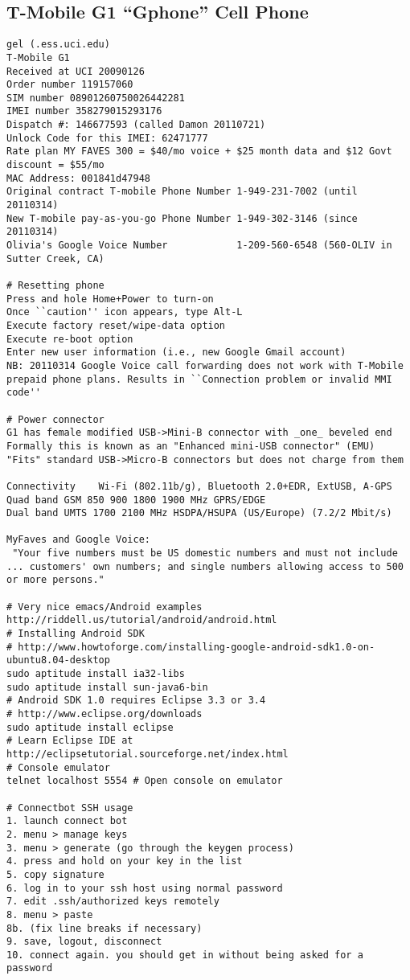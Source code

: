 \documentclass[12pt,twoside]{article}
\begin{document}
\subsection{T-Mobile G1 ``Gphone'' Cell Phone}\label{sxn:g1}
\begin{verbatim}
gel (.ess.uci.edu)
T-Mobile G1
Received at UCI 20090126
Order number 119157060
SIM number 08901260750026442281
IMEI number 358279015293176
Dispatch #: 146677593 (called Damon 20110721) 
Unlock Code for this IMEI: 62471777
Rate plan MY FAVES 300 = $40/mo voice + $25 month data and $12 Govt discount = $55/mo
MAC Address: 001841d47948 
Original contract T-mobile Phone Number 1-949-231-7002 (until 20110314)
New T-mobile pay-as-you-go Phone Number 1-949-302-3146 (since 20110314)
Olivia's Google Voice Number            1-209-560-6548 (560-OLIV in Sutter Creek, CA)

# Resetting phone
Press and hole Home+Power to turn-on
Once ``caution'' icon appears, type Alt-L
Execute factory reset/wipe-data option
Execute re-boot option
Enter new user information (i.e., new Google Gmail account)
NB: 20110314 Google Voice call forwarding does not work with T-Mobile
prepaid phone plans. Results in ``Connection problem or invalid MMI code''

# Power connector
G1 has female modified USB->Mini-B connector with _one_ beveled end
Formally this is known as an "Enhanced mini-USB connector" (EMU)
"Fits" standard USB->Micro-B connectors but does not charge from them

Connectivity 	Wi-Fi (802.11b/g), Bluetooth 2.0+EDR, ExtUSB, A-GPS
Quad band GSM 850 900 1800 1900 MHz GPRS/EDGE
Dual band UMTS 1700 2100 MHz HSDPA/HSUPA (US/Europe) (7.2/2 Mbit/s)

MyFaves and Google Voice:
 "Your five numbers must be US domestic numbers and must not include
... customers' own numbers; and single numbers allowing access to 500
or more persons." 

# Very nice emacs/Android examples
http://riddell.us/tutorial/android/android.html
# Installing Android SDK
# http://www.howtoforge.com/installing-google-android-sdk1.0-on-ubuntu8.04-desktop
sudo aptitude install ia32-libs
sudo aptitude install sun-java6-bin 
# Android SDK 1.0 requires Eclipse 3.3 or 3.4
# http://www.eclipse.org/downloads
sudo aptitude install eclipse
# Learn Eclipse IDE at http://eclipsetutorial.sourceforge.net/index.html
# Console emulator
telnet localhost 5554 # Open console on emulator

# Connectbot SSH usage
1. launch connect bot 
2. menu > manage keys 
3. menu > generate (go through the keygen process) 
4. press and hold on your key in the list 
5. copy signature 
6. log in to your ssh host using normal password 
7. edit .ssh/authorized keys remotely 
8. menu > paste 
8b. (fix line breaks if necessary) 
9. save, logout, disconnect 
10. connect again. you should get in without being asked for a password


\end{verbatim}
\end{document}
